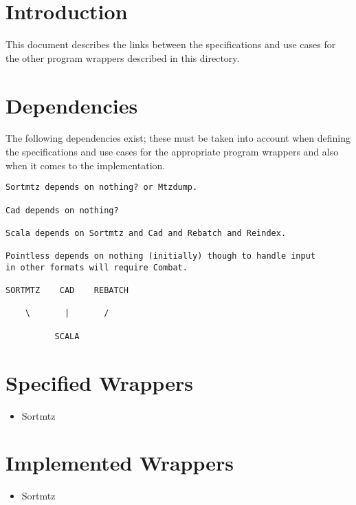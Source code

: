 \documentclass[a4paper, 11pt]{article}
\begin{document}
\section{Introduction}

This document describes the links between the specifications and use cases
for the other program wrappers described in this directory. 

\section{Dependencies}

The following dependencies exist; these must be taken into account when
defining the specifications and use cases for the appropriate program
wrappers and also when it comes to the implementation.

{
\tiny
\begin{verbatim}
Sortmtz depends on nothing? or Mtzdump.

Cad depends on nothing?

Scala depends on Sortmtz and Cad and Rebatch and Reindex.

Pointless depends on nothing (initially) though to handle input
in other formats will require Combat.

SORTMTZ    CAD    REBATCH

    \       |       /

          SCALA 
\end{verbatim}
}


\section{Specified Wrappers}

\begin{itemize}
\item{Sortmtz}
\end{itemize}


\section{Implemented Wrappers}

\begin{itemize}
\item{Sortmtz}
\end{itemize}
\end{document}
